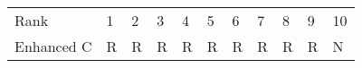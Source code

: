 \begin{tabular}{lllllllllll}
Rank & 1 & 2 & 3 & 4 & 5 & 6 & 7 & 8 & 9 & 10 \\
Enhanced C & R & R & R & R & R & R & R & R & R & N \\
\end{tabular}
